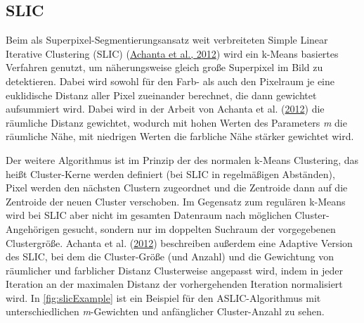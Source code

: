 \documentclass[
  12pt,
]{book}
\begin{document}
\hypertarget{slic}{%
\subsection{SLIC}\label{slic}}

Beim als Superpixel-Segmentierungsansatz weit verbreiteten Simple Linear Iterative Clustering (SLIC) (\protect\hyperlink{ref-achantaSLICSuperpixelsCompared2012}{Achanta et al., 2012}) wird ein k-Means basiertes Verfahren genutzt, um näherungsweise gleich große Superpixel im Bild zu detektieren.
Dabei wird sowohl für den Farb- als auch den Pixelraum je eine euklidische Distanz aller Pixel zueinander berechnet, die dann gewichtet aufsummiert wird. Dabei wird in der Arbeit von Achanta et al. (\protect\hyperlink{ref-achantaSLICSuperpixelsCompared2012}{2012}) die räumliche Distanz gewichtet, wodurch mit hohen Werten des Parameters \emph{m} die räumliche Nähe, mit niedrigen Werten die farbliche Nähe stärker gewichtet wird.

Der weitere Algorithmus ist im Prinzip der des normalen k-Means Clustering, das heißt Cluster-Kerne werden definiert (bei SLIC in regelmäßigen Abständen), Pixel werden den nächsten Clustern zugeordnet und die Zentroide dann auf die Zentroide der neuen Cluster verschoben.
Im Gegensatz zum regulären k-Means wird bei SLIC aber nicht im gesamten Datenraum nach möglichen Cluster-Angehörigen gesucht, sondern nur im doppelten Suchraum der vorgegebenen Clustergröße.
Achanta et al. (\protect\hyperlink{ref-achantaSLICSuperpixelsCompared2012}{2012}) beschreiben außerdem eine Adaptive Version des SLIC, bei dem die Cluster-Größe (und Anzahl) und die Gewichtung von räumlicher und farblicher Distanz Clusterweise angepasst wird, indem in jeder Iteration an der maximalen Distanz der vorhergehenden Iteration normalisiert wird.
In \ref{fig:slicExample} ist ein Beispiel für den ASLIC-Algorithmus mit unterschiedlichen \emph{m}-Gewichten und anfänglicher Cluster-Anzahl zu sehen.
\end{document}

